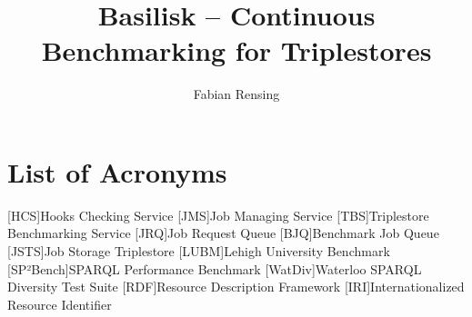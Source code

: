 \documentclass[]{upb_cs_thesis} %
\title{Basilisk -- Continuous Benchmarking for Triplestores}
\author{Fabian Rensing}
\begin{document}
\cleardoublepage
\vspace*{\fill}
\begin{abstract}
	
\end{abstract}
\acresetall
\vspace*{\fill}
\emptypage

\tableofcontents %





\newpage
\pagestyle{plain}



\newpage
{}
\section*{List of Acronyms}
\begin{acronym}[WWWWW]
	[HCS]{Hooks Checking Service}
	[JMS]{Job Managing Service}
	[TBS]{Triplestore Benchmarking Service}
	[JRQ]{Job Request Queue}
	[BJQ]{Benchmark Job Queue}
	[JSTS]{Job Storage Triplestore}
	[LUBM]{Lehigh University Benchmark}
	[SP²Bench]{SPARQL Performance Benchmark}
	[WatDiv]{Waterloo SPARQL Diversity Test Suite}
	[RDF]{Resource Description Framework}
	[IRI]{Internationalized Resource Identifier}
\end{acronym}


\newpage
\appendix

\end{document}

